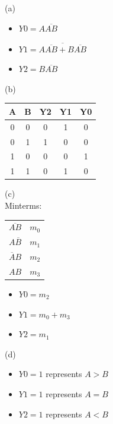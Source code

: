 \documentclass[a4paper]{article}
\begin{document}
\newpage

\begin{answer}[Question 1]
    (a)
    \begin{itemize}
        \item \( Y0 = A \overline{AB} \)
        \item \( Y1 = \overline{A \overline{AB} + B \overline{AB}} \)
        \item \( Y2 = B \overline{AB} \)
    \end{itemize}

    (b)
    \begin{center}
        \begin{tabular}{ |c|c||c|c|c| } 
         \hline
         A & B & Y2 & Y1 & Y0 \\ 
         \hline
         0 & 0 & 0 & 1 & 0 \\ 
         \hline
         0 & 1 & 1 & 0 & 0 \\ 
         \hline
         1 & 0 & 0 & 0 & 1 \\
         \hline
         1 & 1 & 0 & 1 & 0 \\
         \hline
        \end{tabular}
    \end{center}

    (c)\\

    Minterms:
    \begin{center}
    \begin{tabular}{c|c}
    \( \overline{AB} \) & \( m_0 \) \\
    \( A \overline{B} \) & \( m_1 \) \\
    \( \overline{A} B \) & \( m_2 \) \\
    \( AB \) & \( m_3 \) \\
    \end{tabular}
    \end{center}

    \begin{itemize}
        \item \( Y0 = m_2 \)
        \item \( Y1 = m_0 + m_3 \)
        \item \( Y2 = m_1 \)
    \end{itemize}

    (d)

    \begin{itemize}
        \item \( Y0 = 1 \) represents  \( A > B \)
        \item \( Y1 = 1 \) represents \( A = B \)
        \item \( Y2 = 1 \) represents \( A < B \)
    \end{itemize}


\end{answer}
\end{document}
